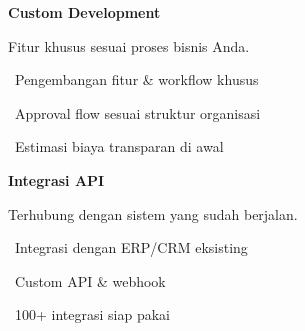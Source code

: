 \documentclass[a4paper]{article}
\begin{document}
\vspace{8pt}

\noindent
\begin{minipage}[t]{0.485\textwidth}
    \colorbox{PurplePrimary}{%
        \begin{minipage}{\dimexpr\textwidth-2\fboxsep\relax}
            {\fontsize{10}{13}\selectfont\bfseries\color{White} Custom Development}
        \end{minipage}}\par
    \vspace{4pt}
    {\fontsize{9}{12}\selectfont\color{TextDark}%
    Fitur khusus sesuai proses bisnis Anda.\par\vspace{3pt}
    \textbullet\ Pengembangan fitur \& workflow khusus\par\vspace{2pt}%
    \textbullet\ Approval flow sesuai struktur organisasi\par\vspace{2pt}%
    \textbullet\ Estimasi biaya transparan di awal}%
\end{minipage}%
\hfill
\begin{minipage}[t]{0.485\textwidth}
    \colorbox{BlueDark}{%
        \begin{minipage}{\dimexpr\textwidth-2\fboxsep\relax}
            {\fontsize{10}{13}\selectfont\bfseries\color{White} Integrasi API}
        \end{minipage}}\par
    \vspace{4pt}
    {\fontsize{9}{12}\selectfont\color{TextDark}%
    Terhubung dengan sistem yang sudah berjalan.\par\vspace{3pt}
    \textbullet\ Integrasi dengan ERP/CRM eksisting\par\vspace{2pt}%
    \textbullet\ Custom API \& webhook\par\vspace{2pt}%
    \textbullet\ 100+ integrasi siap pakai}%
\end{minipage}

\vspace{8pt}
\end{document}
